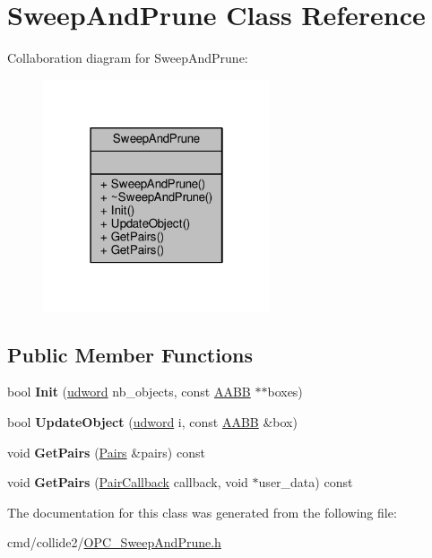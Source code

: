 \hypertarget{classSweepAndPrune}{}\section{Sweep\+And\+Prune Class Reference}
\label{classSweepAndPrune}


Collaboration diagram for Sweep\+And\+Prune\+:
\nopagebreak
\begin{figure}[H]
\begin{center}
\leavevmode
\includegraphics[width=190pt]{df/d0c/classSweepAndPrune__coll__graph}
\end{center}
\end{figure}
\subsection*{Public Member Functions}
\begin{DoxyCompactItemize}
\item 
bool {\bfseries Init} (\hyperlink{IceTypes_8h_a44c6f1920ba5551225fb534f9d1a1733}{udword} nb\+\_\+objects, const \hyperlink{classAABB}{A\+A\+BB} $\ast$$\ast$boxes)\hypertarget{classSweepAndPrune_a4c144d73e7b6831358d5fa3ccf88b389}{}\label{classSweepAndPrune_a4c144d73e7b6831358d5fa3ccf88b389}

\item 
bool {\bfseries Update\+Object} (\hyperlink{IceTypes_8h_a44c6f1920ba5551225fb534f9d1a1733}{udword} i, const \hyperlink{classAABB}{A\+A\+BB} \&box)\hypertarget{classSweepAndPrune_a75e57fa924b1173bc4f88b372ab1d649}{}\label{classSweepAndPrune_a75e57fa924b1173bc4f88b372ab1d649}

\item 
void {\bfseries Get\+Pairs} (\hyperlink{classPairs}{Pairs} \&pairs) const \hypertarget{classSweepAndPrune_a9cea180729e3e965ecbc68c086b079ec}{}\label{classSweepAndPrune_a9cea180729e3e965ecbc68c086b079ec}

\item 
void {\bfseries Get\+Pairs} (\hyperlink{OPC__SweepAndPrune_8h_a4609c7fbc34f117277b8b563bfb2d582}{Pair\+Callback} callback, void $\ast$user\+\_\+data) const \hypertarget{classSweepAndPrune_aaa7080ff61fda85e71ba79f28cbc831d}{}\label{classSweepAndPrune_aaa7080ff61fda85e71ba79f28cbc831d}

\end{DoxyCompactItemize}


The documentation for this class was generated from the following file\+:\begin{DoxyCompactItemize}
\item 
cmd/collide2/\hyperlink{OPC__SweepAndPrune_8h}{O\+P\+C\+\_\+\+Sweep\+And\+Prune.\+h}\end{DoxyCompactItemize}
